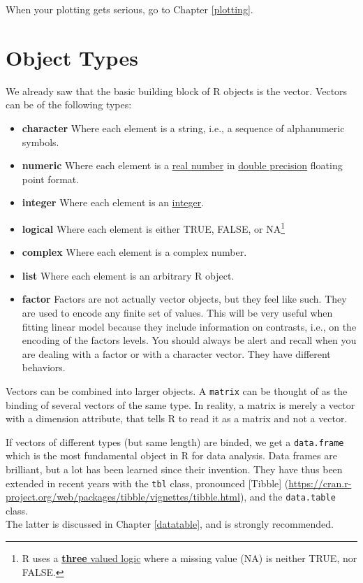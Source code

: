 \documentclass[]{book}
\providecommand{\tightlist}{%
  \setlength{\itemsep}{0pt}\setlength{\parskip}{0pt}}
\theoremstyle{definition}
\theoremstyle{definition}
\theoremstyle{definition}
\theoremstyle{remark}
\begin{document}
When your plotting gets serious, go to Chapter \ref{plotting}.

\section{Object Types}\label{object-types}

We already saw that the basic building block of R objects is the vector.
Vectors can be of the following types:

\begin{itemize}
\tightlist
\item
  \textbf{character} Where each element is a string, i.e., a sequence of
  alphanumeric symbols.
\item
  \textbf{numeric} Where each element is a
  \href{https://en.wikipedia.org/wiki/Real_number}{real number} in
  \href{https://en.wikipedia.org/wiki/Double-precision_floating-point_format}{double
  precision} floating point format.
\item
  \textbf{integer} Where each element is an
  \href{https://en.wikipedia.org/wiki/Integer}{integer}.
\item
  \textbf{logical} Where each element is either TRUE, FALSE, or
  NA\footnote{R uses a
    \href{https://en.wikipedia.org/wiki/Three-valued_logic}{\textbf{three}
    valued logic} where a missing value (NA) is neither TRUE, nor FALSE.}
\item
  \textbf{complex} Where each element is a complex number.
\item
  \textbf{list} Where each element is an arbitrary R object.
\item
  \textbf{factor} Factors are not actually vector objects, but they feel
  like such. They are used to encode any finite set of values. This will
  be very useful when fitting linear model because they include
  information on contrasts, i.e., on the encoding of the factors levels.
  You should always be alert and recall when you are dealing with a
  factor or with a character vector. They have different behaviors.
\end{itemize}

Vectors can be combined into larger objects. A \texttt{matrix} can be
thought of as the binding of several vectors of the same type. In
reality, a matrix is merely a vector with a dimension attribute, that
tells R to read it as a matrix and not a vector.

If vectors of different types (but same length) are binded, we get a
\texttt{data.frame} which is the most fundamental object in R for data
analysis. Data frames are brilliant, but a lot has been learned since
their invention. They have thus been extended in recent years with the
\texttt{tbl} class, pronounced {[}Tibble{]}
(\url{https://cran.r-project.org/web/packages/tibble/vignettes/tibble.html}),
and the \texttt{data.table} class.\\
The latter is discussed in Chapter \ref{datatable}, and is strongly
recommended.
\end{document}
